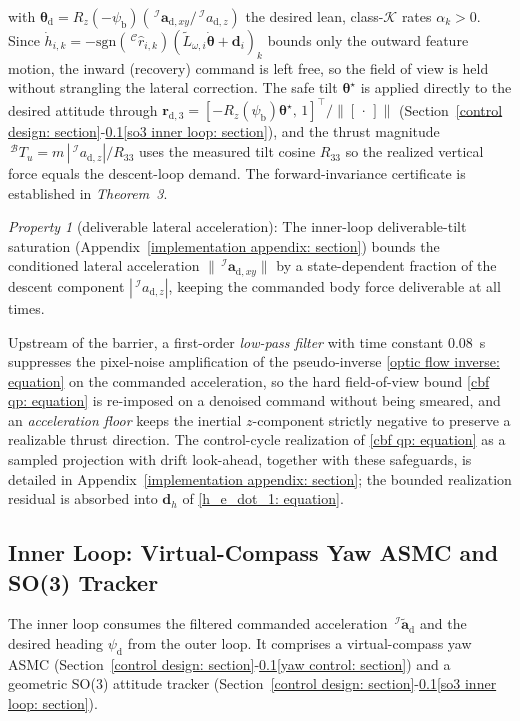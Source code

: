 \documentclass{IEEEtaes}
\begin{document}
with $\boldsymbol{\theta}_\text{d}=R_z(-\psi_\text{b})(\,^\mathcal{I}\boldsymbol{a}_{\text{d},xy}/\,^\mathcal{I}a_{\text{d},z})$ the desired lean, class-$\mathcal{K}$ rates $\alpha_k>0$. Since $\dot{h}_{i,k}=-\mathrm{sgn}(\,^\mathcal{C}\hat{r}_{i,k})(\tilde{L}_{\omega,i}\dot{\boldsymbol{\theta}}+\boldsymbol{d}_i)_k$ bounds only the outward feature motion, the inward (recovery) command is left free, so the field of view is held without strangling the lateral correction. The safe tilt $\boldsymbol{\theta}^\star$ is applied directly to the desired attitude through $\boldsymbol{r}_{\text{d},3}=[-R_z(\psi_\text{b})\boldsymbol{\theta}^\star,\,1]^\top/\|[\,\cdot\,]\|$ (Section~\ref{control design: section}-\ref{inner loop: section}\ref{so3 inner loop: section}), and the thrust magnitude $\,^\mathcal{B}T_u=m\,|\,^\mathcal{I}a_{\text{d},z}|/R_{33}$ uses the measured tilt cosine $R_{33}$ so the realized vertical force equals the descent-loop demand. The forward-invariance certificate is established in \textit{Theorem~3}.

\textit{Property 1} (deliverable lateral acceleration): The inner-loop deliverable-tilt saturation (Appendix~\ref{implementation appendix: section}) bounds the conditioned lateral acceleration $\|\,^\mathcal{I}\boldsymbol{a}_{\text{d},xy}\|$ by a state-dependent fraction of the descent component $|\,^\mathcal{I}a_{\text{d},z}|$, keeping the commanded body force deliverable at all times.

Upstream of the barrier, a first-order \emph{low-pass filter} with time constant $0.08$~s suppresses the pixel-noise amplification of the pseudo-inverse \eqref{optic flow inverse: equation} on the commanded acceleration, so the hard field-of-view bound \eqref{cbf qp: equation} is re-imposed on a denoised command without being smeared, and an \emph{acceleration floor} keeps the inertial $z$-component strictly negative to preserve a realizable thrust direction. The control-cycle realization of \eqref{cbf qp: equation} as a sampled projection with drift look-ahead, together with these safeguards, is detailed in Appendix~\ref{implementation appendix: section}; the bounded realization residual is absorbed into $\boldsymbol{d}_h$ of \eqref{h_e_dot_1: equation}.

\subsection{Inner Loop: Virtual-Compass Yaw ASMC and SO(3) Tracker} \label{inner loop: section}
The inner loop consumes the filtered commanded acceleration $\,^\mathcal{I}\tilde{\boldsymbol{a}}_\text{d}$ and the desired heading $\psi_\text{d}$ from the outer loop. It comprises a virtual-compass yaw ASMC (Section~\ref{control design: section}-\ref{inner loop: section}\ref{yaw control: section}) and a geometric SO(3) attitude tracker (Section~\ref{control design: section}-\ref{inner loop: section}\ref{so3 inner loop: section}).
\end{document}

